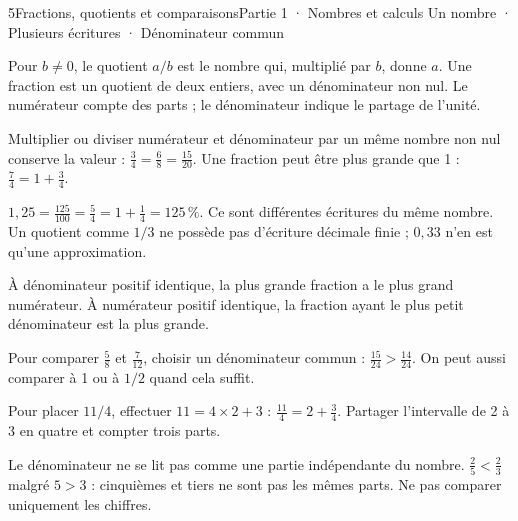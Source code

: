 \begin{ouverture}[calcul]{5}{Fractions, quotients et comparaisons}{Partie 1 · Nombres et calculs}
{Un nombre · Plusieurs écritures · Dénominateur commun}
\end{ouverture}
\pagestyle{otMain}\essentiel\fontsize{11}{15}\selectfont
{}\label{cours-5-1}
\begin{definition}Pour $b\ne0$, le quotient $a/b$ est le nombre qui, multiplié par $b$, donne $a$. Une fraction est un quotient de deux entiers, avec un dénominateur non nul. Le numérateur compte des parts ; le dénominateur indique le partage de l’unité.\end{definition}
\label{fig-cours-5-1-cours-fractions}

\begin{propriete}Multiplier ou diviser numérateur et dénominateur par un même nombre non nul conserve la valeur : $\frac34=\frac68=\frac{15}{20}$. Une fraction peut être plus grande que 1 : $\frac74=1+\frac34$.\end{propriete}
\begin{exemple}$1{,}25=\frac{125}{100}=\frac54=1+\frac14=125\,\%$. Ce sont différentes écritures du même nombre. Un quotient comme $1/3$ ne possède pas d’écriture décimale finie ; $0{,}33$ n’en est qu’une approximation.\end{exemple}
\clearpage
{}\label{cours-5-2}
\begin{propriete}À dénominateur positif identique, la plus grande fraction a le plus grand numérateur. À numérateur positif identique, la fraction ayant le plus petit dénominateur est la plus grande.\end{propriete}
\begin{savoirfaire}Pour comparer $\frac58$ et $\frac7{12}$, choisir un dénominateur commun : $\frac{15}{24}>\frac{14}{24}$. On peut aussi comparer à 1 ou à $1/2$ quand cela suffit.\end{savoirfaire}
\begin{exemple}Pour placer $11/4$, effectuer $11=4\times2+3$ : $\frac{11}4=2+\frac34$. Partager l’intervalle de 2 à 3 en quatre et compter trois parts.\end{exemple}
\begin{attention}Le dénominateur ne se lit pas comme une partie indépendante du nombre. $\frac25<\frac23$ malgré $5>3$ : cinquièmes et tiers ne sont pas les mêmes parts. Ne pas comparer uniquement les chiffres.\end{attention}

